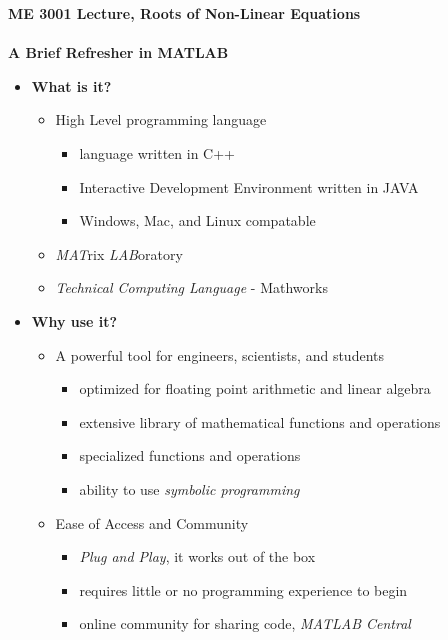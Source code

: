 \documentclass[11pt]{article}
\begin{document}
\textbf{ \LARGE ME 3001 Lecture, Roots of Non-Linear Equations} \\\\
\textbf{ \LARGE A Brief Refresher in MATLAB} \\

\begin{itemize}

	\item  \textbf{\LARGE What is it?}
		\LARGE
		\begin{itemize}
			\item High Level programming language
				\begin{itemize}
					\item language written in C++
					\item Interactive Development Environment written in JAVA 
					\item Windows, Mac, and Linux compatable
				\end{itemize}
			\item {\it MAT}rix {\it LAB}oratory
			\item {\it Technical Computing Language} - Mathworks
		\end{itemize}	

	\item \textbf{\LARGE Why use it?}
		\begin{itemize}
			\item A powerful tool for engineers, scientists, and students
				\begin{itemize}	
					\item  optimized for floating point arithmetic and linear algebra
					\item extensive library of mathematical functions and operations 
					\item specialized functions and operations
						\begin{itemize}
						\end{itemize}
					\item ability to use {\it symbolic programming }	
				\end{itemize}
			\item Ease of Access and Community
				\begin{itemize}
					\item {\it Plug and Play}, it works out of the box
					\item requires little or no programming experience to begin
					\item online community for sharing code,  {\it MATLAB Central}
				\end{itemize}
		\end{itemize}


\end{itemize}
\end{document}
